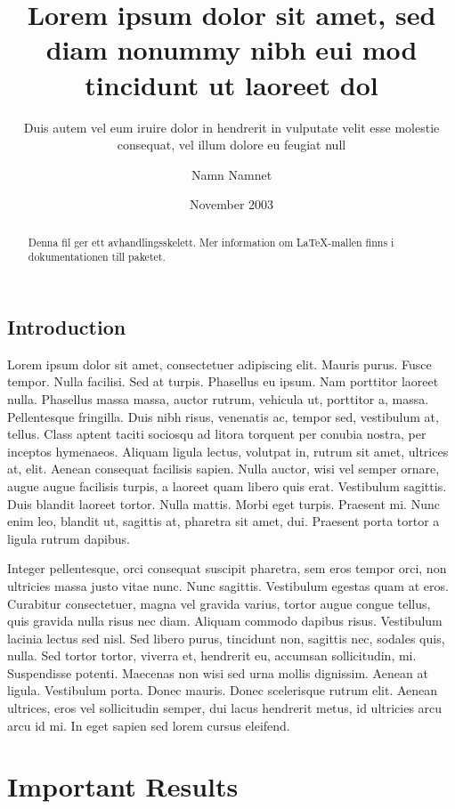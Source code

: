 \documentclass[showtrims]{kth-mag}
\title{Lorem ipsum dolor sit amet, sed diam nonummy nibh eui
       mod tincidunt ut laoreet dol}
\subtitle{Duis autem vel eum iruire dolor in hendrerit in
          vulputate velit esse molestie consequat, vel illum
          dolore eu feugiat null}
\author{Namn Namnet}
\date{November 2003}
\begin{document}
\frontmatter
\maketitle

\clearpage
{}
\begin{abstract}
  Denna fil ger ett avhandlingsskelett.
  Mer information om \LaTeX-mallen finns i
  dokumentationen till paketet.
\end{abstract}
\clearpage
\tableofcontents
\mainmatter
\chapter{Introduction}

Lorem ipsum dolor sit amet, consectetuer adipiscing elit. Mauris
purus. Fusce tempor. Nulla facilisi. Sed at turpis. Phasellus eu
ipsum. Nam porttitor laoreet nulla. Phasellus massa massa, auctor
rutrum, vehicula ut, porttitor a, massa. Pellentesque fringilla. Duis
nibh risus, venenatis ac, tempor sed, vestibulum at, tellus. Class
aptent taciti sociosqu ad litora torquent per conubia nostra, per
inceptos hymenaeos. Aliquam ligula lectus, volutpat in, rutrum sit
amet, ultrices at, elit. Aenean consequat facilisis sapien. Nulla
auctor, wisi vel semper ornare, augue augue facilisis turpis, a
laoreet quam libero quis erat. Vestibulum sagittis. Duis blandit
laoreet tortor. Nulla mattis. Morbi eget turpis. Praesent mi. Nunc
enim leo, blandit ut, sagittis at, pharetra sit amet, dui. Praesent
porta tortor a ligula rutrum dapibus.

Integer pellentesque, orci consequat suscipit pharetra, sem eros
tempor orci, non ultricies massa justo vitae nunc. Nunc sagittis.
Vestibulum egestas quam at eros. Curabitur consectetuer, magna vel
gravida varius, tortor augue congue tellus, quis gravida nulla risus
nec diam. Aliquam commodo dapibus risus. Vestibulum lacinia lectus sed
nisl. Sed libero purus, tincidunt non, sagittis nec, sodales quis,
nulla. Sed tortor tortor, viverra et, hendrerit eu, accumsan
sollicitudin, mi. Suspendisse potenti. Maecenas non wisi sed urna
mollis dignissim. Aenean at ligula. Vestibulum porta. Donec mauris.
Donec scelerisque rutrum elit. Aenean ultrices, eros vel sollicitudin
semper, dui lacus hendrerit metus, id ultricies arcu arcu id mi. In
eget sapien sed lorem cursus eleifend.

\part{Important Results}
\end{document}
